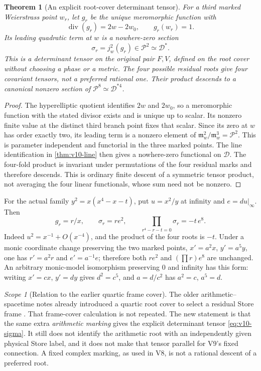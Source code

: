 \documentclass[11pt]{article}
\newtheorem{theorem}{Theorem}[section]
\theoremstyle{definition}
\theoremstyle{remark}
\newtheorem{scope}[scope]{Scope}
\begin{document}
\begin{theorem}[An explicit root-cover determinant tensor]
\label{thm:v10-root-section}
For a third marked Weierstrass point $w_r$, let $g_r$ be the unique
meromorphic function with
\[
 \operatorname{div}(g_r)=2w-2w_0,\qquad g_r(w_r)=1.
\]
Its leading quadratic term at $w$ is a nowhere-zero section
\begin{equation}
 \boxed{\sigma_r=j_w^2(g_r)\in\mathscr P^2
   \simeq\mathscr D^*.}
 \label{eq:v10-sigma}
\end{equation}
This is a determinant tensor on the \emph{original} pair $F,V$, defined
on the root cover without choosing a phase or a metric. The four possible
residual roots give four covariant tensors, not a preferred rational one.
Their product descends to a canonical nonzero section of
$\mathscr P^8\simeq\mathscr D^{*4}$.
\end{theorem}
\begin{proof}
The hyperelliptic quotient identifies $2w$ and $2w_0$, so a meromorphic
function with the stated divisor exists and is unique up to scalar.
Its nonzero finite value at the distinct third branch point fixes that
scalar. Since its zero at $w$ has order exactly two, its leading term
is a nonzero element of $\mathfrak m_w^2/\mathfrak m_w^3=\mathscr P^2$.
This is parameter independent and functorial in the three marked points.
The line identification in \cref{thm:v10-line} then gives a nowhere-zero
functional on $\mathscr D$. The four-fold product is invariant under
permutations of the four residual marks and therefore descends. This is
ordinary finite descent of a symmetric tensor product, not averaging the
four linear functionals, whose sum need not be nonzero.
\end{proof}

For the actual family $y^2=x(x^4-x-t)$, put $u=x^2/y$ at infinity and
$e=du|_\infty$. Then
\begin{equation}
 \boxed{g_r=r/x,\qquad\sigma_r=r e^2,\qquad
 \prod_{r^4-r-t=0}\sigma_r=-t\,e^8.}
 \label{eq:v10-root-product}
\end{equation}
Indeed $u^2=x^{-1}+O(x^{-4})$, and the product of the four roots is
$-t$. Under a monic coordinate change preserving the two marked points,
$x'=a^2x$, $y'=a^5y$, one has $r'=a^2r$ and $e'=a^{-1}e$;
therefore both $r e^2$ and $(\prod r)e^8$ are unchanged. An arbitrary
monic-model isomorphism preserving $0$ and infinity has this form: writing
$x'=c x$, $y'=d y$ gives $d^2=c^5$, and $a=d/c^2$ has
$a^2=c$, $a^5=d$.

\begin{scope}[Relation to the earlier quartic frame cover]
The older arithmetic--spacetime notes already introduced a quartic root
cover to select a residual Store frame \cite{AD9}. That frame-cover
calculation is not repeated. The new statement is that the same extra
\emph{arithmetic marking} gives the explicit determinant tensor
\cref{eq:v10-sigma}. It still does not identify the arithmetic root with
an independently given physical Store label, and it does not make that
tensor parallel for V9's fixed connection. A fixed complex marking, as
used in V8, is not a rational descent of a preferred root.
\end{scope}
\end{document}
